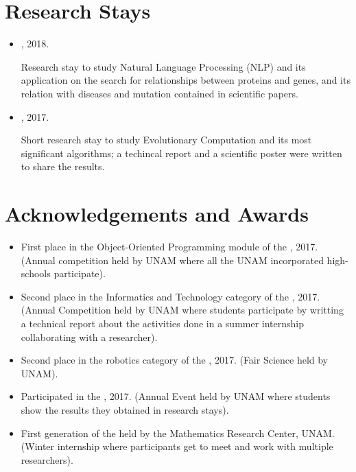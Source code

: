 \documentclass{curriculum-vitae}
\begin{document}
  \section{Research Stays}
    \begin{itemize}
      \item
        , 2018.

        Research stay to study Natural Language Processing (NLP) and its
        application on the search for relationships between proteins and genes,
        and its relation with diseases and mutation contained in scientific
        papers.

      \item
        ,
        2017.

        Short research stay to study Evolutionary Computation and its most
        significant algorithms; a techincal report and a scientific poster were
        written to share the results.

    \end{itemize}

  \section{Acknowledgements and Awards}

    \begin{itemize}
      \item
        First place in the Object-Oriented Programming module of the
        , 2017. (Annual competition held by
        UNAM where all the UNAM incorporated high-schools participate).

      \item
        Second place in the Informatics and Technology category of the
        , 2017. (Annual
        Competition held by UNAM where students participate by writting a
        technical report about the activities done in a summer internship
        collaborating with a researcher).

      \item
        Second place in the robotics category of the ,
        2017. (Fair Science held by UNAM).

      \item
        Participated in the ,
        2017. (Annual Event held by UNAM where students show the results they
        obtained in research stays).

      \item
        First generation of the 
        held by the Mathematics Research Center, UNAM. (Winter internship where
        participants get to meet and work with multiple researchers).
    \end{itemize}
\end{document}
